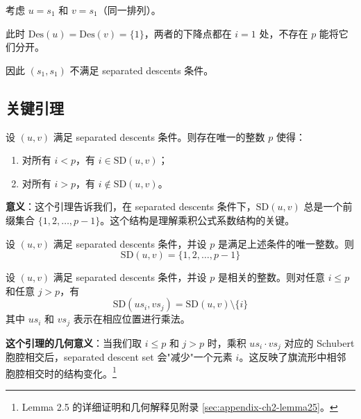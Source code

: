 \begin{Example}[不满足条件的例子]
考虑 $u = s_1$ 和 $v = s_1$（同一排列）。

此时 $\mathrm{Des}(u) = \mathrm{Des}(v) = \{1\}$，两者的下降点都在 $i=1$ 处，不存在 $p$ 能将它们分开。

因此 $(s_1, s_1)$ 不满足 separated descents 条件。
\end{Example}

\subsection{关键引理}

\begin{Lemma}
\label{lema:SD-lemma2}
设 $(u, v)$ 满足 separated descents 条件。则存在唯一的整数 $p$ 使得：
\begin{enumerate}
\item 对所有 $i < p$，有 $i \in \mathrm{SD}(u, v)$；
\item 对所有 $i > p$，有 $i \notin \mathrm{SD}(u, v)$。
\end{enumerate}
\end{Lemma}

\textbf{意义}：这个引理告诉我们，在 separated descents 条件下，$\mathrm{SD}(u,v)$ 总是一个前缀集合 $\{1,2,\ldots,p-1\}$。这个结构是理解乘积公式系数结构的关键。

\begin{Lemma}
\label{lema:SD-lemma3}
设 $(u, v)$ 满足 separated descents 条件，并设 $p$ 是满足上述条件的唯一整数。则
\begin{equation}
\mathrm{SD}(u, v) = \{1, 2, \ldots, p-1\}
\label{eq:SD-is-p}
\end{equation}
\end{Lemma}

\begin{Lemma}
\label{lema:SD-lemma5}
设 $(u, v)$ 满足 separated descents 条件，并设 $p$ 是相关的整数。则对任意 $i \leq p$ 和任意 $j > p$，有
\begin{equation}
\mathrm{SD}(us_i, vs_j) = \mathrm{SD}(u, v) \setminus \{i\}
\label{eq:SD-after-mult}
\end{equation}
其中 $us_i$ 和 $vs_j$ 表示在相应位置进行乘法。
\end{Lemma}

\textbf{这个引理的几何意义}：当我们取 $i \leq p$ 和 $j > p$ 时，乘积 $us_i \cdot vs_j$ 对应的 Schubert 胞腔相交后，separated descent set 会"减少"一个元素 $i$。这反映了旗流形中相邻胞腔相交时的结构变化。\footnote{Lemma 2.5 的详细证明和几何解释见附录 \cref{sec:appendix-ch2-lemma25}。}

